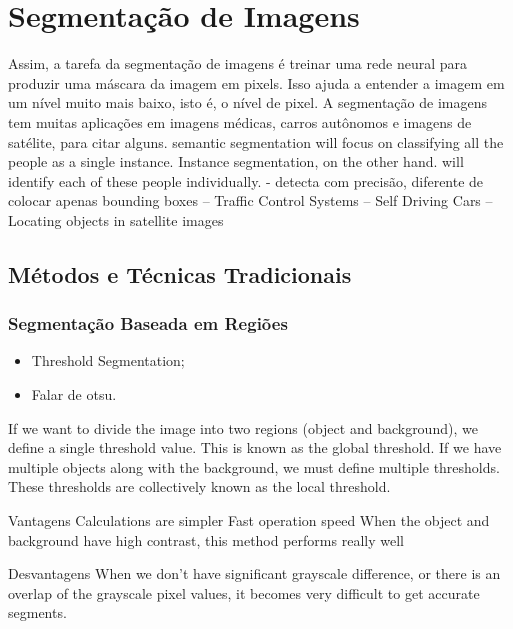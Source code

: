 \newpage
\section{Segmentação de Imagens}
Assim, a tarefa da segmentação de imagens é treinar uma rede neural para produzir uma máscara da imagem em pixels. Isso ajuda a entender a imagem em um nível muito mais baixo, isto é, o nível de pixel. A segmentação de imagens tem muitas aplicações em imagens médicas, carros autônomos e imagens de satélite, para citar alguns.
semantic segmentation will focus on classifying all the people as a single instance. Instance segmentation, on the other hand. will identify each of these people individually.
- detecta com precisão, diferente de colocar apenas bounding boxes
-- Traffic Control Systems
-- Self Driving Cars
-- Locating objects in satellite images


\subsection{Métodos e Técnicas Tradicionais}
\subsubsection{Segmentação Baseada em Regiões}
\begin{itemize}
    \item Threshold Segmentation;
    \item Falar de otsu.
\end{itemize}
If we want to divide the image into two regions (object and background), we define a single threshold value. This is known as the global threshold.
If we have multiple objects along with the background, we must define multiple thresholds. These thresholds are collectively known as the local threshold.

Vantagens
Calculations are simpler
Fast operation speed
When the object and background have high contrast, this method performs really well

Desvantagens
When we don’t have significant grayscale difference, or there is an overlap of the grayscale pixel values, it becomes very difficult to get accurate segments.


